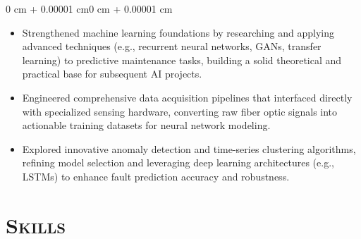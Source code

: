 \documentclass[10pt, letterpaper]{article}
\newenvironment{highlights}{
    \begin{itemize}[
        topsep=0.10 cm,
        parsep=0.10 cm,
        partopsep=0pt,
        itemsep=0pt,
        leftmargin=0.4 cm + 10pt
    ]
}{
    \end{itemize}
}
\newenvironment{onecolentry}{
    \begin{adjustwidth}{0 cm + 0.00001 cm}{0 cm + 0.00001 cm}
}{
    \end{adjustwidth}
}
\begin{document}
\vspace{0.10 cm}
\begin{onecolentry}
    \begin{highlights}
        \item Strengthened machine learning foundations by researching and applying advanced techniques (e.g., recurrent neural networks, GANs, transfer learning) to predictive maintenance tasks, building a solid theoretical and practical base for subsequent AI projects.
        \item Engineered comprehensive data acquisition pipelines that interfaced directly with specialized sensing hardware, converting raw fiber optic signals into actionable training datasets for neural network modeling.
        \item Explored innovative anomaly detection and time-series clustering algorithms, refining model selection and leveraging deep learning architectures (e.g., LSTMs) to enhance fault prediction accuracy and robustness.
    \end{highlights}
\end{onecolentry}


\section{\scshape Skills}
\end{document}
